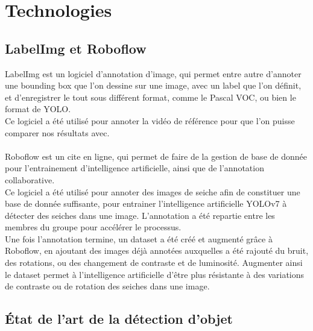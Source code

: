 \chapter{Technologies}

\section{LabelImg et Roboflow}
LabelImg est un logiciel d'annotation d'image, qui permet entre autre d'annoter une bounding box que l'on dessine sur une image, avec un label que l'on définit, et d'enregistrer le tout sous différent format, comme le Pascal VOC, ou bien le format de YOLO.\\
Ce logiciel a été utilisé pour annoter la vidéo de référence pour que l'on puisse comparer nos résultats avec.\\
\\
Roboflow est un cite en ligne, qui permet de faire de la gestion de base de donnée pour l'entrainement d'intelligence artificielle, ainsi que de l'annotation collaborative.\\
Ce logiciel a été utilisé pour annoter des images de seiche afin de constituer une base de donnée suffisante, pour entrainer l'intelligence artificielle YOLOv7\cite{wang_yolov7_nodate} à détecter des seiches dans une image. L'annotation a été repartie entre les membres du groupe pour accélérer le processus.\\
Une fois l'annotation termine, un dataset a été créé et augmenté grâce à Roboflow, en ajoutant des images déjà annotées auxquelles a été rajouté du bruit, des rotations, ou des changement de contraste et de luminosité. Augmenter ainsi le dataset permet à l'intelligence artificielle d'être plus résistante à des variations de contraste ou de rotation des seiches dans une image.\\




\section{État de l'art de la détection d'objet}




